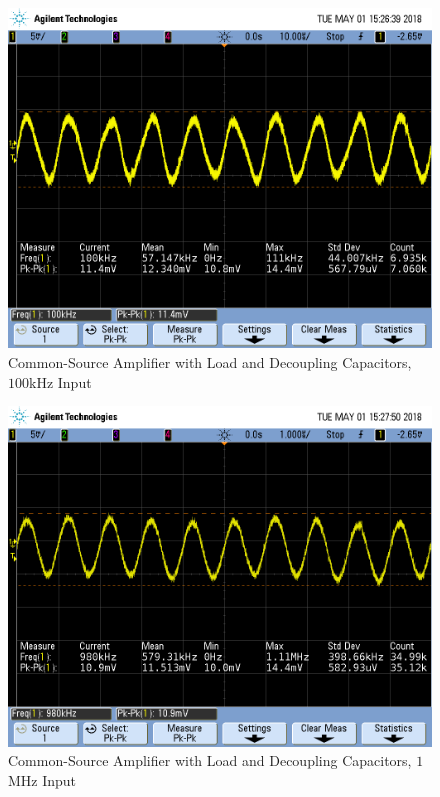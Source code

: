 \FloatBarrier


\FloatBarrier

\begin{figure}[h!]
	\centering
	\includegraphics[scale=0.45]{./images/SCOPE_14.PNG}
	\caption{Common-Source Amplifier with Load and Decoupling Capacitors, $100$\si{\kilo\hertz} Input}
	\label{fig:SCOPE_14}
\end{figure}

\FloatBarrier

\FloatBarrier

\begin{figure}[h!]
	\centering
	\includegraphics[scale=0.45]{./images/SCOPE_15.PNG}
	\caption{Common-Source Amplifier with Load and Decoupling Capacitors, $1$\si{\mega\hertz} Input}
	\label{fig:SCOPE_15}
\end{figure}

